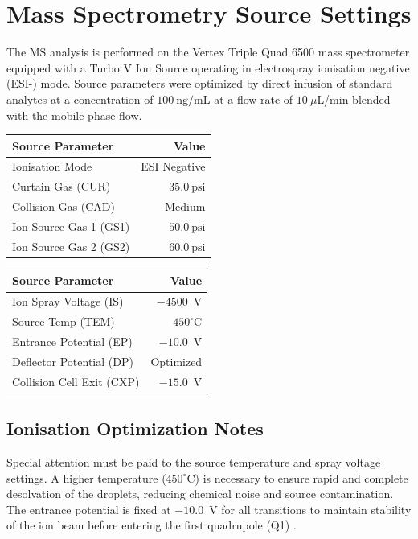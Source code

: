 \section{Mass Spectrometry Source Settings}
The MS analysis is performed on the Vertex Triple Quad 6500 mass spectrometer equipped with a Turbo V Ion Source operating in electrospray ionisation negative (ESI-) mode. Source parameters were optimized by direct infusion of standard analytes at a concentration of $100~\text{ng/mL}$ at a flow rate of $10~\mu$L/min blended with the mobile phase flow.

\noindent
\begin{minipage}[t]{0.48\textwidth}
    \begin{tcolorbox}[msbox, title=Ion Source Gas Parameters]
        \begin{tabularx}{\textwidth}{X r}
            \textbf{Source Parameter} & \textbf{Value} \\
            \midrule
            Ionisation Mode & ESI Negative \\
            Curtain Gas (CUR) & $35.0~\text{psi}$ \\
            Collision Gas (CAD) & Medium \\
            Ion Source Gas 1 (GS1) & $50.0~\text{psi}$ \\
            Ion Source Gas 2 (GS2) & $60.0~\text{psi}$ \\
        \end{tabularx}
    \end{tcolorbox}
\end{minipage}
\hfill
\begin{minipage}[t]{0.48\textwidth}
    \begin{tcolorbox}[msaccentbox, title=Thermal \& Voltage Settings]
        \begin{tabularx}{\textwidth}{X r}
            \textbf{Source Parameter} & \textbf{Value} \\
            \midrule
            Ion Spray Voltage (IS) & $-4500$~V \\
            Source Temp (TEM) & $450^\circ\text{C}$ \\
            Entrance Potential (EP) & $-10.0$~V \\
            Deflector Potential (DP) & Optimized \\
            Collision Cell Exit (CXP) & $-15.0$~V \\
        \end{tabularx}
    \end{tcolorbox}
\end{minipage}
\par
\vspace{0.5cm}
\subsection{Ionisation Optimization Notes}
Special attention must be paid to the source temperature and spray voltage settings. A higher temperature ($450^\circ\text{C}$) is necessary to ensure rapid and complete desolvation of the droplets, reducing chemical noise and source contamination. The entrance potential is fixed at $-10.0$~V for all transitions to maintain stability of the ion beam before entering the first quadrupole (Q1) \cite{massspec2021}.
